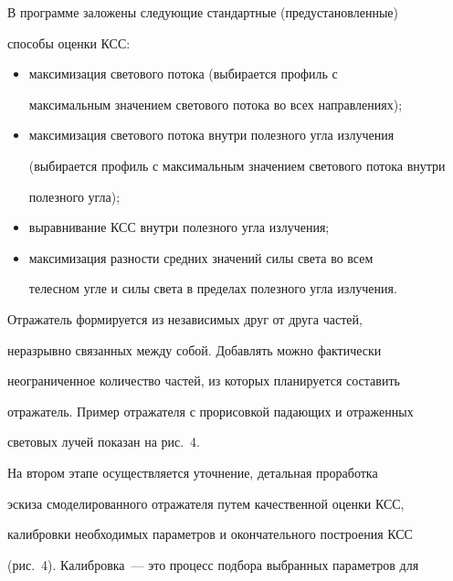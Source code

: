   


  В программе заложены следующие стандартные (предустановленные) 


способы оценки КСС:


  \begin{itemize}


\item максимизация светового потока (выбирается профиль с 


максимальным значением светового потока во всех направлениях);


\item максимизация светового потока внутри полезного угла излучения 


(выбирается профиль с максимальным значением светового потока внутри 


полезного угла);


\item выравнивание КСС внутри полезного угла излучения;


\item максимизация разности средних значений силы света во всем 


телесном угле и силы света в пределах полезного угла излучения.


\end{itemize}





  Отражатель формируется из независимых друг от друга частей, 


неразрывно связанных между собой. Добавлять можно фактически 


неограниченное количество частей, из которых планируется составить 


отражатель. Пример отражателя с прорисовкой падающих и отраженных 


световых лучей показан на рис.~4.











  На втором этапе осуществляется уточнение, детальная проработка 


эскиза смоделированного отражателя путем качественной оценки КСС, 


калибровки необходимых параметров и окончательного построения КСС 


(рис.~4). Калибровка~--- это процесс подбора выбранных параметров для 


